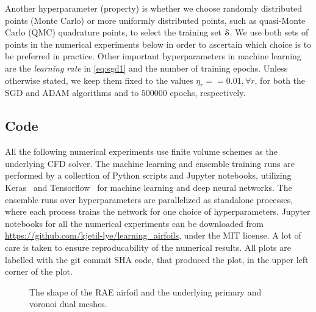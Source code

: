 \documentclass[a4paper]{article}
\numberwithin{equation}{section}
\numberwithin{equation}{section}
\theoremstyle{definition}
\theoremstyle{myremarkstyle}
\newcommand{\train}{\EuScript{S}}
\begin{document}
Another hyperparameter (property) is whether we choose randomly distributed points (Monte Carlo) or more uniformly distributed points, such as quasi-Monte Carlo (QMC) quadrature points, to select the training set $\train$. We use both sets of points in the numerical experiments below in order to ascertain which choice is to be preferred in practice. Other important hyperparameters in machine learning are the \emph{learning rate} in \eqref{eq:sgd1} and the number of training epochs. Unless otherwise stated, we keep them fixed to the values $\eta_r = = 0.01, \forall r$, for both the SGD and ADAM algorithms and to $500000$ epochs, respectively. 
\subsection{Code}
\label{sec:code}
All the following numerical experiments use finite volume schemes as the underlying CFD solver. The machine learning and ensemble training runs are performed by a collection of Python scripts and Jupyter notebooks, utilizing Keras~\cite{keras} and Tensorflow~\cite{tensorflow} for machine learning and deep neural networks. The ensemble runs over hyperparameters are parallelized as standalone processes, where each process trains the network for one choice of hyperparameters. Jupyter notebooks for all the numerical experiments can be downloaded from \url{https://github.com/kjetil-lye/learning_airfoils}, under the MIT license. A lot of care is taken to ensure reproducability of the numerical results. All plots are labelled with the git commit SHA code, that produced the plot, in the upper left corner of the plot.
\begin{figure}[htbp]
\caption{The shape of the RAE airfoil and the underlying primary and voronoi dual meshes.}
\label{fig:rae_mesh}
\end{figure}
\end{document}
